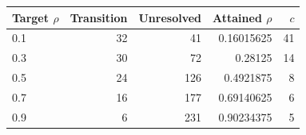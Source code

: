 {\small\setlength{\tabcolsep}{3pt}
\begin{tabular}{lrrrr}
\hline
Target $\rho$ & Transition & Unresolved & Attained $\rho$ & $c$ \\
\hline
0.1 & 32 & 41 & 0.16015625 & 41 \\
0.3 & 30 & 72 & 0.28125 & 14 \\
0.5 & 24 & 126 & 0.4921875 & 8 \\
0.7 & 16 & 177 & 0.69140625 & 6 \\
0.9 & 6 & 231 & 0.90234375 & 5 \\
\hline
\end{tabular}
}
